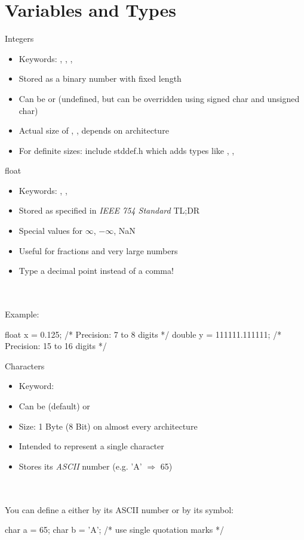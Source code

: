 \documentclass[10pt,graphics,aspectratio=169,table]{beamer}
\begin{document}
\section{Variables and Types}
\begin{frame}{Integers}
    \begin{itemize}
        \item Keywords: , , , 
        \item Stored as a binary number with fixed length
        \item Can be  or  (undefined, but can be overridden using signed char and unsigned char)
        \item Actual size of , ,  depends on architecture
        \item For definite sizes: include stddef.h which adds types like , , 
    \end{itemize}
\end{frame}
\begin{frame}[fragile]{float}
    \begin{itemize}
        \item Keywords: , , 
        \item Stored as specified in \textit{IEEE 754 Standard} TL;DR
        \item Special values for $\infty$, $-\infty$, NaN
        \item Useful for fractions and very large numbers
        \item Type a decimal point instead of a comma!
    \end{itemize}\ \\
    \ \\
    Example:
    \begin{codeblock}
float x = 0.125;             /* Precision: 7 to 8 digits */
double y = 111111.111111;    /* Precision: 15 to 16 digits */
    \end{codeblock}

\end{frame}
\begin{frame}[fragile]{Characters}
    \begin{itemize}
        \item Keyword: 
        \item Can be (default) or     
        \item Size: 1 Byte (8 Bit) on almost every architecture
        \item Intended to represent a single character
        \item Stores its \textit{ASCII} number (e.g. 'A' $\Rightarrow$ 65)
    \end{itemize}\ \\
    \ \\
    You can define a  either by its ASCII number or by its symbol:
    \begin{codeblock}
char a = 65;
char b = 'A';    /* use single quotation marks */
    \end{codeblock}
\end{frame}
\end{document}

